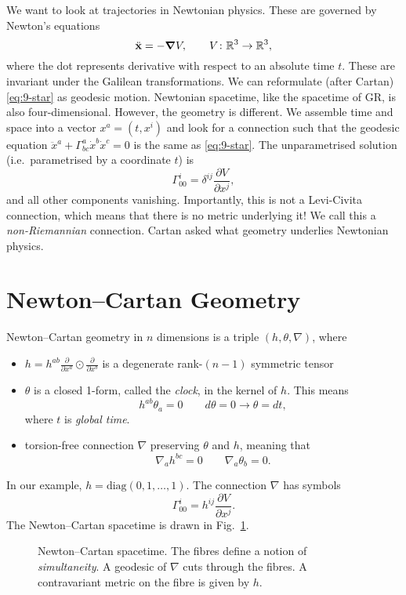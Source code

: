 We want to look at trajectories in Newtonian physics.
These are governed by Newton's equations
\begin{equation}
  \label{eq:9-star}
  \ddot{\vb{x}} = - \grad V, \qquad V \colon \mathbb{R}^3 \to \mathbb{R}^3,
\end{equation}
where the dot represents derivative with respect to an absolute time $t$.
These are invariant under the Galilean transformations.
We can reformulate (after Cartan) \eqref{eq:9-star} as geodesic motion.
Newtonian spacetime, like the spacetime of GR, is also four-dimensional. However, the geometry is different.
We assemble time and space into a vector $x^a = (t, x^{i})$ and look for a connection such that the geodesic equation $ \ddot x^{a}  + \Gamma^{a}_{bc} \dot x^{b} \dot x^{c} = 0 $ is the same as \eqref{eq:9-star}.
The unparametrised solution (i.e.~parametrised by a coordinate $t$) is
\begin{equation}
  \Gamma^{i}_{00} = \delta^{ij} \frac{\partial V}{\partial x^{j}},
\end{equation}
and all other components vanishing.
Importantly, this is not a Levi-Civita connection, which means that there is no metric underlying it!
We call this a \emph{non-Riemannian} connection.
Cartan asked what geometry underlies Newtonian physics.

\section{Newton--Cartan Geometry}%
\label{sec:newton_cartan_geometry}

Newton--Cartan geometry in $n$ dimensions is a triple $(h, \theta, \nabla)$, where
\begin{itemize}
  \item $h = h^{ab} \frac{\partial }{\partial x^{a}} \odot \frac{\partial }{\partial x^{b}}$ is a degenerate rank-$(n-1)$ symmetric tensor
  \item $\theta$ is a closed 1-form, called the \emph{clock}, in the kernel of $h$. This means
    \begin{equation}
      h^{ab} \theta_{a} = 0 \qquad d\theta = 0 \rightarrow \theta = d t,
    \end{equation}
    where $t$ is \emph{global time}.
  \item torsion-free connection $\nabla$ preserving $\theta$ and $h$, meaning that
    \begin{equation}
      \nabla_a h^{bc} = 0 \qquad \nabla_a \theta_b = 0.
    \end{equation}
\end{itemize}
In our example, $h = \text{diag}(0,1, \dots, 1)$. The connection $\nabla$ has symbols
\begin{equation}
  \Gamma^i_{00} = h^{ij} \frac{\partial V}{\partial x^{j}}.
\end{equation}
The Newton--Cartan spacetime is drawn in Fig.~\ref{fig:l9f4}.
\begin{figure}[tbhp]
  \centering
  \def\svgwidth{0.4\columnwidth}
  
  \caption{Newton--Cartan spacetime. The fibres define a notion of \emph{simultaneity}. A geodesic of $\nabla$ cuts through the fibres. A contravariant metric on the fibre is given by $h$.}
  \label{fig:l9f4}
\end{figure}
